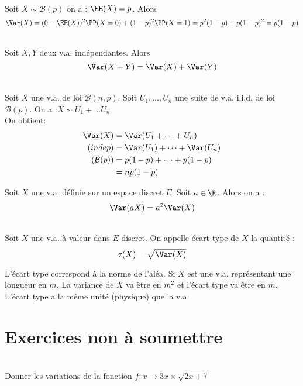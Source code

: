 \documentclass[12pt,fleqn]{report} %
\begin{document}
\begin{example}\text{ }\\
	Soit $X \sim \mathcal{B}(p)$ on a : $\EE(X) = p$.
	Alors \[
	\Var(X) = (0 - \EE(X))^2 \PP(X = 0) + (1 - p)^2\PP(X = 1) = p^2(1-p) + p(1-p)^2 = p(1-p)
	\] 
\end{example}

\begin{proposition}\text{ }\\
	Soit $X,Y$ deux v.a. indépendantes.
	Alors \[
	\Var(X + Y) = \Var(X) + \Var(Y)
	\]
\end{proposition}

\begin{example}\text{ }\\
	Soit $X$ une v.a. de loi $\mathcal{B}(n,p)$. Soit $U_1,\dots,U_n$ une suite de v.a. i.i.d. de loi $\mathcal{B}(p)$. On a :$X \sim U_1 + \dots U_n $ \\
	On obtient: 
	\begin{align*}
	\Var(X) & = \Var(U_1 + \dots + U_n) \\
	(indep) & =\Var(U_1) + \dots + \Var(U_n) \\
	(\mathcal{B}(p)) & = p(1 - p) + \dots + p(1-p) \\
	& = np(1-p) 
	\end{align*}
\end{example}

\begin{proposition}
	Soit $X$ une v.a. définie sur un espace discret $E$. Soit $a \in \R$. Alors on a :\[
	\Var(aX) = a^2 \Var(X)
	\]
\end{proposition}
\begin{definition}\text{ }\\
	Soit $X$ une v.a. à valeur dans $E$ discret. On appelle écart type de $X$ la quantité : \[
	\sigma(X) = \sqrt{\Var(X)}
	\]
\end{definition}
\begin{remark}
	L'écart type correspond à la norme de l'aléa. Si $X$ est une v.a. représentant une longueur en $m$. La variance de $X$ va être en $m^2$ et l'écart type va être en $m$. L'écart type a la même unité (physique) que la v.a.
\end{remark}

\chapter*{Exercices non à soumettre}
\begin{exercise}\label{Exercice 5}\text{ }\\
	Donner les variations de la fonction $f : x \mapsto 3x \times \sqrt{2x+7}$
	
\end{exercise}
\end{document}
